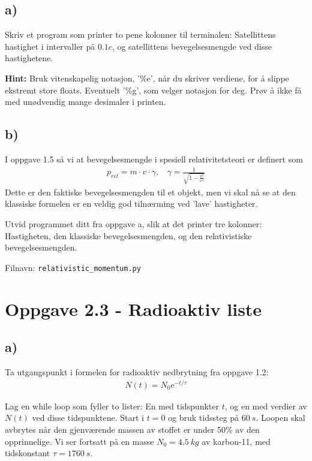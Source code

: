 \documentclass[10pt,a4paper]{article}
\renewcommand{\exp}{\mathrm{e}^}
\begin{document}
\subsection*{a)}
Skriv et program som printer to pene kolonner til terminalen: Satellittens hastighet i intervaller på $0.1 c$, og satellittens bevegelsesmengde ved disse hastighetene.
 
\textbf{Hint:} Bruk vitenskapelig notasjon, '\%e', når du skriver verdiene, for å slippe ekstremt store floats. Eventuelt '\%g', som velger notasjon for deg. Prøv å ikke få med unødvendig mange desimaler i printen.
 
 
\subsection*{b)}
I oppgave 1.5 så vi at bevegelsesmengde i spesiell relativitetsteori er definert som
\begin{align*}
p_{rel} = m\cdot v\cdot \gamma, \ \ \ \ \gamma = \frac{1}{\sqrt{1-\frac{v^2}{c^2}}}
\end{align*}
Dette er den faktiske bevegelsesmengden til et objekt, men vi skal nå se at den klassiske formelen er en veldig god tilnærming ved 'lave' hastigheter.
 
Utvid programmet ditt fra oppgave a, slik at det printer tre kolonner: Hastigheten, den klassiske bevegelsesmengden, og den relativistiske bevegelsesmengden.
 
Filnavn: \texttt{relativistic\_momentum.py}
 
 
 
\section*{Oppgave 2.3 - Radioaktiv liste}
\subsection*{a)}
Ta utgangspunkt i formelen for radioaktiv nedbrytning fra oppgave 1.2:
\begin{align*}
N(t) = N_0\exp{-t/\tau}
\end{align*}

Lag en while loop som fyller to lister: En med tidspunkter $t$, og en med verdier av $N(t)$ ved disse tidspunktene. Start i $t=0$ og bruk tidssteg på $\SI{60}{s}$. Loopen skal avbrytes når den gjenværende massen av stoffet er under 50\% av den opprinnelige. Vi ser fortsatt på en masse $N_0 = \SI{4.5}{kg}$ av karbon-11, med tidskonstant $\tau = \SI{1760}{s}$.
 
\end{document}
